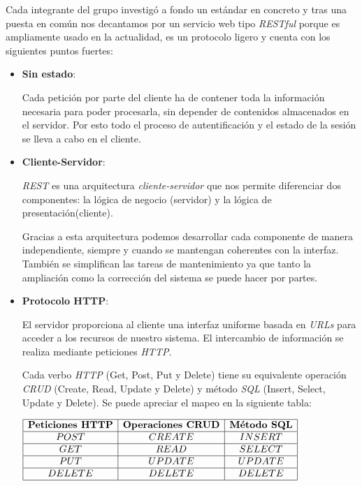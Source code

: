 Cada integrante del grupo investigó a fondo un estándar en concreto y tras una puesta en común nos decantamos por un servicio web tipo \textit{RESTful} porque es ampliamente usado en la actualidad, es un protocolo ligero y cuenta con los siguientes puntos fuertes:
\begin{itemize}
\item \textbf{Sin estado}:

Cada petición por parte del cliente ha de contener toda la información necesaria para poder procesarla, sin depender de contenidos almacenados en el servidor. Por esto todo el proceso de autentificación y el estado de la sesión se lleva a cabo en el cliente.

\item \textbf{Cliente-Servidor}:

\textit{REST} es una arquitectura \textit{cliente-servidor} que nos permite diferenciar dos componentes: la lógica de negocio (servidor) y la lógica de presentación(cliente).
 
Gracias a esta arquitectura podemos desarrollar cada componente de manera independiente, siempre y cuando se mantengan coherentes con la interfaz. También se simplifican las tareas de mantenimiento ya que tanto la ampliación como la corrección del sistema se puede hacer por partes.

\item \textbf{Protocolo HTTP}:

El servidor proporciona al cliente una interfaz uniforme basada en \textit{URLs} para acceder a los recursos de nuestro sistema. El intercambio de información se realiza mediante peticiones \textit{HTTP}.

Cada verbo \textit{HTTP} (Get, Post, Put y Delete) tiene su equivalente operación \textit{CRUD} (Create, Read, Update y Delete) y método \textit{SQL} (Insert, Select, Update y Delete). Se puede apreciar el mapeo en la siguiente tabla:


$\mathit{
\begin{array}{|c|c|c|}
\hline
\textbf{Peticiones HTTP} & \textbf{Operaciones CRUD} & \textbf{Método SQL}\\
\hline
POST & CREATE & INSERT\\
\hline
GET & READ & SELECT\\
\hline
PUT & UPDATE & UPDATE\\
\hline
DELETE & DELETE & DELETE\\
\hline
\end{array}
}$

\end{itemize} 

